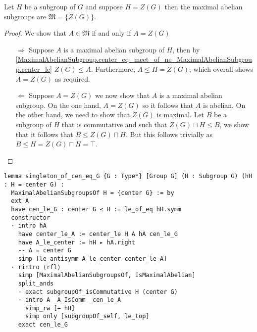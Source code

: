 \begin{lemma}
\label{MaximalAbelianSubgroup.singleton_of_cen_eq_G}
\leanok
Let $H$ be a subgroup of $G$ and suppose $H = Z(G)$ then the maximal abelian subgroups are $\mathfrak{M} = \{Z(G)\}$.
\end{lemma}
\begin{proof}
  \leanok
  We show that $A \in \mathfrak{M}$ if and only if $A = Z(G)$
  \begin{itemize}
    \item[$\Rightarrow$] Suppose $A$ is a maximal abelian subgroup of $H$, then by \ref{MaximalAbelianSubgroup.center_eq_meet_of_ne_MaximalAbelianSubgroup.center_le} $Z(G) \le A$. Furthermore, $A \le H = Z(G)$; which overall shows $A = Z(G)$ as required.
    \item[$\Leftarrow$] Suppose $A = Z(G)$ we now show that $A$ is a maximal abelian subgroup. 
      On the one hand, $A = Z(G)$ so it follows that $A$ is abelian.
      On the other hand, we need to show that $Z(G)$ is maximal. Let $B$ be a subgroup of $H$ that is commutative and such that $Z(G) \sqcap H \le B$, we show that it follows that $B \le Z(G) \sqcap H$. But this follows trivially as 
      $B \leq H = Z(G) \sqcap H = \top$.
  \end{itemize}
\end{proof}
\begin{footnotesize}
\begin{verbatim}
lemma singleton_of_cen_eq_G {G : Type*} [Group G] (H : Subgroup G) (hH : H = center G) :
  MaximalAbelianSubgroupsOf H = {center G} := by
  ext A
  have cen_le_G : center G ≤ H := le_of_eq hH.symm
  constructor
  · intro hA
    have center_le_A := center_le H A hA cen_le_G
    have A_le_center := hH ▸ hA.right
    -- A = center G
    simp [le_antisymm A_le_center center_le_A]
  · rintro ⟨rfl⟩
    simp [MaximalAbelianSubgroupsOf, IsMaximalAbelian]
    split_ands
    · exact subgroupOf_isCommutative H (center G)
    · intro A _A_IsComm _cen_le_A
      simp_rw [← hH]
      simp only [subgroupOf_self, le_top]
    exact cen_le_G
\end{verbatim}
\end{footnotesize}


